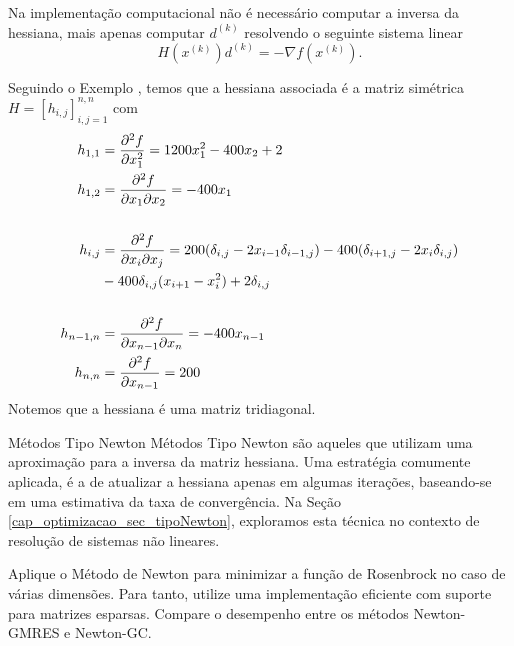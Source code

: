 \begin{obs}
  Na implementação computacional não é necessário computar a inversa da hessiana, mais apenas computar $d^{(k)}$ resolvendo o seguinte sistema linear
  \begin{equation}
    H(x^{(k)})d^{(k)} = -\nabla f(x^{(k)}).
  \end{equation}
\end{obs}

\begin{ex}\label{ex:optNewtonGC}
  Seguindo o Exemplo \label{ex:Rosenbrock}, temos que a hessiana associada é a matriz simétrica $H = [h_{i,j}]_{i,j=1}^{n,n}$ com
  \begin{align}
    h_{1,1} &= \frac{\partial^2 f}{\partial x_1^2} = 1200x_1^2-400x_2+2\\
    h_{1,2} &= \frac{\partial^2 f}{\partial x_1\partial x_2} = -400x_1\\
            &~\nonumber\\
    h_{i,j} &= \frac{\partial^2 f}{\partial x_i\partial x_j} = 200(\delta_{i,j}-2x_{i-1}\delta_{i-1,j}) - 400(\delta_{i+1,j}-2x_i\delta_{i,j})\nonumber\\
            &- 400\delta_{i,j}(x_{i+1}-x_i^2) + 2\delta_{i,j}\\
            &~\nonumber\\
    h_{n-1,n} &= \frac{\partial^2 f}{\partial x_{n-1}\partial x_n} = -400x_{n-1}\\
    h_{n,n} &= \frac{\partial^2 f}{\partial x_{n-1}} = 200
  \end{align}
  Notemos que a hessiana é uma matriz tridiagonal.

    
\end{ex}

\begin{obs}{Métodos Tipo Newton}
  Métodos Tipo Newton são aqueles que utilizam uma aproximação para a inversa da matriz hessiana. Uma estratégia comumente aplicada, é a de atualizar a hessiana apenas em algumas iterações, baseando-se em uma estimativa da taxa de convergência. Na Seção \ref{cap_optimizacao_sec_tipoNewton}, exploramos esta técnica no contexto de resolução de sistemas não lineares.
\end{obs}

\begin{exer}
  Aplique o Método de Newton para minimizar a função de Rosenbrock no caso de várias dimensões. Para tanto, utilize uma implementação eficiente com suporte para matrizes esparsas. Compare o desempenho entre os métodos Newton-GMRES e Newton-GC. 
\end{exer}

